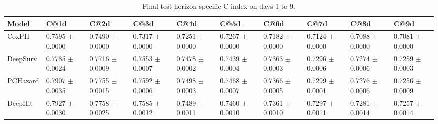 \begin{table}
\caption{Final test horizon-specific C-index on days 1 to 9.}
\label{tab:static_horizon_c_index}
\begin{tabular}{llllllllll}
\toprule
Model & C@1d & C@2d & C@3d & C@4d & C@5d & C@6d & C@7d & C@8d & C@9d \\
\midrule
CoxPH & 0.7595 $\pm$ 0.0000 & 0.7490 $\pm$ 0.0000 & 0.7317 $\pm$ 0.0000 & 0.7251 $\pm$ 0.0000 & 0.7267 $\pm$ 0.0000 & 0.7182 $\pm$ 0.0000 & 0.7124 $\pm$ 0.0000 & 0.7088 $\pm$ 0.0000 & 0.7081 $\pm$ 0.0000 \\
DeepSurv & 0.7785 $\pm$ 0.0024 & 0.7716 $\pm$ 0.0009 & 0.7553 $\pm$ 0.0007 & 0.7478 $\pm$ 0.0002 & 0.7439 $\pm$ 0.0004 & 0.7363 $\pm$ 0.0003 & 0.7296 $\pm$ 0.0006 & 0.7274 $\pm$ 0.0006 & 0.7259 $\pm$ 0.0003 \\
PCHazard & 0.7907 $\pm$ 0.0035 & 0.7755 $\pm$ 0.0015 & 0.7592 $\pm$ 0.0006 & 0.7498 $\pm$ 0.0003 & 0.7468 $\pm$ 0.0007 & 0.7366 $\pm$ 0.0005 & 0.7299 $\pm$ 0.0001 & 0.7276 $\pm$ 0.0006 & 0.7256 $\pm$ 0.0009 \\
DeepHit & 0.7927 $\pm$ 0.0030 & 0.7758 $\pm$ 0.0025 & 0.7585 $\pm$ 0.0012 & 0.7489 $\pm$ 0.0011 & 0.7460 $\pm$ 0.0010 & 0.7361 $\pm$ 0.0010 & 0.7297 $\pm$ 0.0011 & 0.7281 $\pm$ 0.0014 & 0.7257 $\pm$ 0.0014 \\
\bottomrule
\end{tabular}
\end{table}
